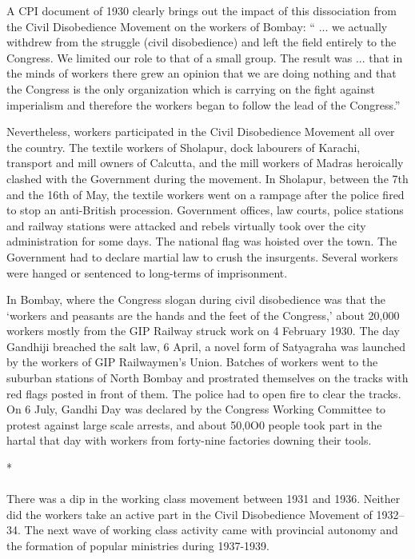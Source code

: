 \begin{multicols}{2}
A CPI document of 1930 clearly brings out the impact of this dissociation from the Civil Disobedience Movement on the workers of Bombay: `` ... we actually withdrew from the struggle (civil disobedience) and left the field entirely to the Congress. We limited our role to that of a small group. The result was ... that in the minds of workers there grew an opinion that we are doing nothing and that the Congress is the only organization which is carrying on the fight against imperialism and therefore the workers began to follow the lead of the Congress.''

Nevertheless, workers participated in the Civil Disobedience Movement all over the country. The textile workers of Sholapur, dock labourers of Karachi, transport and mill owners of Calcutta, and the mill workers of Madras heroically clashed with the Government during the movement. In Sholapur, between the 7th and the 16th of May, the textile workers went on a rampage after the police fired to stop an anti-British procession. Government offices, law courts, police stations and railway stations were attacked and rebels virtually took over the city administration for some days. The national flag was hoisted over the town. The Government had to declare martial law to crush the insurgents. Several workers were hanged or sentenced to long-terms of imprisonment.

In Bombay, where the Congress slogan during civil disobedience was that the `workers and peasants are the hands and the feet of the Congress,' about 20,000 workers mostly from the GIP Railway struck work on 4 February 1930. The day Gandhiji breached the salt law, 6 April, a novel form of Satyagraha was launched by the workers of GIP Railwaymen's Union. Batches of workers went to the suburban stations of North Bombay and prostrated themselves on the tracks with red flags posted in front of them. The police had to open fire to clear the tracks. On 6 July, Gandhi Day was declared by the Congress Working Committee to protest against large scale arrests, and about 50,0O0 people took part in the hartal that day with workers from forty-nine factories downing their tools.

\begin{center}*\end{center}

\paragraph*{}
There was a dip in the working class movement between 1931 and 1936. Neither did the workers take an active part in the Civil Disobedience Movement of 1932--34. The next wave of working class activity came with provincial autonomy and the formation of popular ministries during 1937-1939.


\end{multicols}
